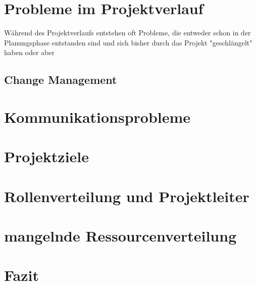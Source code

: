 \documentclass[12pt]{scrartcl}
\begin{document}
\section{Probleme im Projektverlauf} 

Während des Projektverlaufs entstehen oft Probleme, die entweder schon in der Planungsphase entstanden sind und sich bisher durch das Projekt "geschlängelt" haben oder aber 

\subsection{Change Management}

\cite{profPM}
\cite{scriptPM}
\cite{chaosReportCriteria}

\pagebreak
\section{Kommunikationsprobleme}
\section{Projektziele}
\section{Rollenverteilung und Projektleiter}
\section{mangelnde Ressourcenverteilung}


\section{Fazit}

\pagebreak
{} %


\appendix
\end{document}
